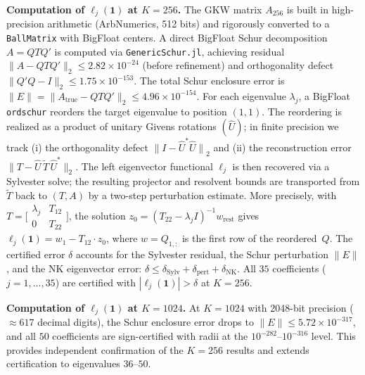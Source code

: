 \documentclass[11pt]{article}
\begin{document}
\medskip\noindent
\textbf{Computation of $\ell_j(\mathbf{1})$ at $K = 256$.}
The GKW matrix $A_{256}$ is built in high-precision arithmetic (ArbNumerics, 512 bits)
and rigorously converted to a \texttt{BallMatrix} with BigFloat centers.
A direct BigFloat Schur decomposition $A = Q T Q'$ is computed via
\texttt{GenericSchur.jl}, achieving residual $\|A - QTQ'\|_2 \leq 2.82 \times 10^{-24}$
(before refinement) and orthogonality defect $\|Q'Q - I\|_2 \leq 1.75 \times 10^{-153}$.
The total Schur enclosure error is
$\|E\| = \|A_{\mathrm{true}} - QTQ'\|_2 \leq 4.96 \times 10^{-154}$.
For each eigenvalue $\lambda_j$, a BigFloat \texttt{ordschur} reorders the target eigenvalue
to position $(1,1)$. The reordering is realized as a product of unitary Givens rotations $(\widehat U)$;
in finite precision we track (i) the orthogonality defect ${\|I-\widehat U^*\widehat U\|}_2$ and
(ii) the reconstruction error $\|T-\widehat U\,\widetilde T\,\widehat U^*\|_2$.
The left eigenvector functional $\ell_j$ is then recovered via a Sylvester solve; the resulting projector
and resolvent bounds are transported from $\widetilde T$ back to $(T,A)$ by a two-step perturbation estimate.
More precisely, with $T = \bigl[\begin{smallmatrix} \lambda_j & T_{12} \\ 0 & T_{22}\end{smallmatrix}\bigr]$,
the solution $z_0 = (T_{22} - \lambda_j I)^{-1} w_{\mathrm{rest}}$ gives
$\ell_j(\mathbf{1}) = w_1 - T_{12} \cdot z_0$,
where $w = Q_{1,:}$ is the first row of the reordered~$Q$.
The certified error $\delta$ accounts for the Sylvester residual,
the Schur perturbation $\|E\|$, and the NK eigenvector error:
$\delta \leq \delta_{\mathrm{Sylv}} + \delta_{\mathrm{pert}} + \delta_{\mathrm{NK}}$.
All $35$ coefficients ($j = 1, \ldots, 35$) are certified with $|\ell_j(\mathbf{1})| > \delta$
at $K = 256$.

\medskip\noindent
\textbf{Computation of $\ell_j(\mathbf{1})$ at $K = 1024$.}
At $K = 1024$ with 2048-bit precision ($\approx 617$ decimal digits),
the Schur enclosure error drops to
$\|E\| \leq 5.72 \times 10^{-317}$,
and all $50$ coefficients are sign-certified with radii at the $10^{-282}$--$10^{-316}$ level.
This provides independent confirmation of the $K = 256$ results and extends
certification to eigenvalues $36$--$50$.
\end{document}
